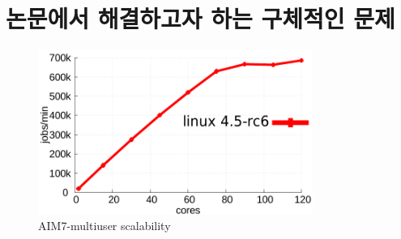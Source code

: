\newpage
\section{논문에서 해결하고자 하는 구체적인 문제}\label{sec:bg}




\begin{figure}[h]
    \centering
    \includegraphics[width=0.8\textwidth]{graph/aim7_default}
    \caption{AIM7-multiuser scalability}
  \label{fig:aim7_default}
\end{figure}

